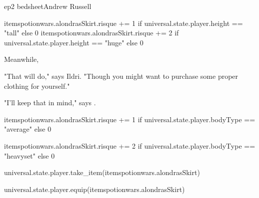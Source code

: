 \documentclass{book}
\begin{document}
\begin{childnode}{ep2 bedsheet}{Andrew Russell}
    \begin{code}
        
        itemspotionwars.alondrasSkirt.risque += 1 if universal.state.player.height == "tall" else 0
        itemspotionwars.alondrasSkirt.risque += 2 if universal.state.player.height == "huge" else 0

    \end{code}

    Meanwhile, 



    "That will do," says Ildri. "Though you might want to purchase some proper clothing for yourself." 

    "I'll keep that in mind," says \name{}.

    \begin{code}
        
        itemspotionwars.alondrasSkirt.risque += 1 if universal.state.player.bodyType == "average" else 0

        itemspotionwars.alondrasSkirt.risque += 2 if universal.state.player.bodyType == "heavyset" else 0

    \end{code}

    \begin{code}

        universal.state.player.take\_item(itemspotionwars.alondrasSkirt)

        universal.state.player.equip(itemspotionwars.alondrasSkirt)

    \end{code}

\end{childnode}
\end{document}
